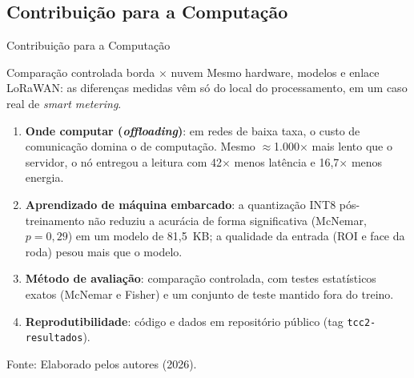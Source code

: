 \documentclass[
    aspectratio=169,
    11pt,
    brazil
]{beamer}
\newcommand{\fonteslide}[1]{\par\vfill{\tiny\color{black!60}#1\par}}
\begin{document}
\subsection{Contribuição para a Computação}
\begin{frame}{Contribuição para a Computação}
  \begin{block}{Comparação controlada borda $\times$ nuvem}
    \footnotesize Mesmo hardware, modelos e enlace LoRaWAN: as diferenças medidas vêm só do local do processamento, em um caso real de \textit{smart metering}.
  \end{block}
  \vspace{0.15cm}
  \begin{enumerate}\footnotesize
    \setlength{\itemsep}{4pt}
    \item \textbf{Onde computar (\textit{offloading})}: em redes de baixa taxa, o custo de comunicação domina o de computação. Mesmo $\approx$1.000$\times$ mais lento que o servidor, o nó entregou a leitura com 42$\times$ menos latência e 16,7$\times$ menos energia.
    \item \textbf{Aprendizado de máquina embarcado}: a quantização INT8 pós-treinamento não reduziu a acurácia de forma significativa (McNemar, $p = 0{,}29$) em um modelo de 81,5~KB; a qualidade da entrada (ROI e face da roda) pesou mais que o modelo.
    \item \textbf{Método de avaliação}: comparação controlada, com testes estatísticos exatos (McNemar e Fisher) e um conjunto de teste mantido fora do treino.
    \item \textbf{Reprodutibilidade}: código e dados em repositório público (tag \texttt{tcc2-resultados}).
  \end{enumerate}
  \fonteslide{Fonte: Elaborado pelos autores (2026).}
\end{frame}
\end{document}
